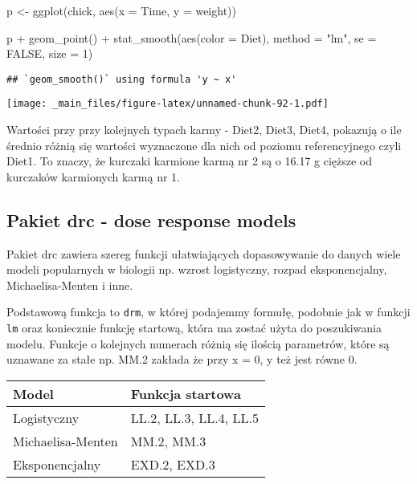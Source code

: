 \documentclass[
]{book}
\newenvironment{Shaded}{\begin{snugshade}}{\end{snugshade}}
\newcommand{\AttributeTok}[1]{\textcolor[rgb]{0.77,0.63,0.00}{#1}}
\newcommand{\ConstantTok}[1]{\textcolor[rgb]{0.00,0.00,0.00}{#1}}
\newcommand{\DecValTok}[1]{\textcolor[rgb]{0.00,0.00,0.81}{#1}}
\newcommand{\FunctionTok}[1]{\textcolor[rgb]{0.00,0.00,0.00}{#1}}
\newcommand{\NormalTok}[1]{#1}
\newcommand{\OtherTok}[1]{\textcolor[rgb]{0.56,0.35,0.01}{#1}}
\newcommand{\SpecialCharTok}[1]{\textcolor[rgb]{0.00,0.00,0.00}{#1}}
\newcommand{\StringTok}[1]{\textcolor[rgb]{0.31,0.60,0.02}{#1}}
\begin{document}
\begin{Shaded}
\begin{Highlighting}[]
\NormalTok{p }\OtherTok{\textless{}{-}} \FunctionTok{ggplot}\NormalTok{(chick, }\FunctionTok{aes}\NormalTok{(}\AttributeTok{x =}\NormalTok{ Time, }\AttributeTok{y =}\NormalTok{ weight))}

\NormalTok{p }\SpecialCharTok{+} \FunctionTok{geom\_point}\NormalTok{() }\SpecialCharTok{+} \FunctionTok{stat\_smooth}\NormalTok{(}\FunctionTok{aes}\NormalTok{(}\AttributeTok{color =}\NormalTok{ Diet), }\AttributeTok{method =} \StringTok{"lm"}\NormalTok{, }\AttributeTok{se =} \ConstantTok{FALSE}\NormalTok{, }\AttributeTok{size =} \DecValTok{1}\NormalTok{)}
\end{Highlighting}
\end{Shaded}

\begin{verbatim}
## `geom_smooth()` using formula 'y ~ x'
\end{verbatim}

\texttt{[image: \_main\_files/figure-latex/unnamed-chunk-92-1.pdf]}

Wartości przy przy kolejnych typach karmy - Diet2, Diet3, Diet4, pokazują o ile średnio różnią się wartości wyznaczone dla nich od poziomu referencyjnego czyli Diet1. To znaczy, że kurczaki karmione karmą nr 2 są o 16.17 g cięższe od kurczaków karmionych karmą nr 1.

\hypertarget{pakiet-drc---dose-response-models}{%
\subsection{Pakiet drc - dose response models}\label{pakiet-drc---dose-response-models}}

Pakiet drc zawiera szereg funkcji ułatwiających dopasowywanie do danych wiele modeli popularnych w biologii np. wzrost logistyczny, rozpad eksponencjalny, Michaelisa-Menten i inne.

Podstawową funkcja to \texttt{drm}, w której podajemmy formułę, podobnie jak w funkcji \texttt{lm} oraz koniecznie funkcję startową, która ma zostać użyta do poszukiwania modelu. Funkcje o kolejnych numerach różnią się ilością parametrów, które są uznawane za stałe np. MM.2 zakłada że przy x = 0, y też jest równe 0.

\begin{longtable}[]{@{}ll@{}}
\toprule
Model & Funkcja startowa \\
\midrule
\endhead
Logistyczny & LL.2, LL.3, LL.4, LL.5 \\
Michaelisa-Menten & MM.2, MM.3 \\
Eksponencjalny & EXD.2, EXD.3 \\
\bottomrule
\end{longtable}
\end{document}
